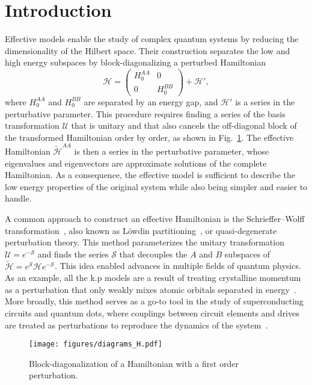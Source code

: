 \section{Introduction}

Effective models enable the study of complex quantum systems by reducing the dimensionality of the Hilbert space.
Their construction separates the low and high energy subspaces by block-diagonalizing a perturbed Hamiltonian
%
\begin{equation}
    \mathcal{H} = \begin{pmatrix}H_0^{AA} & 0 \\ 0 & H_0^{BB}\end{pmatrix} + \mathcal{H}',
\end{equation}
%
where $H_0^{AA}$ and $H_0^{BB}$ are separated by an energy gap, and $\mathcal{H}'$ is a series in the perturbative parameter.
This procedure requires finding a series of the basis transformation $\mathcal{U}$ that is unitary and that also cancels the off-diagonal block of the transformed Hamiltonian order by order, as shown in Fig.~\ref{fig:block_diagonalization}.
The effective Hamiltonian $\tilde{\mathcal{H}}^{AA}$ is then a series in the perturbative parameter, whose eigenvalues and eigenvectors are approximate solutions of the complete Hamiltonian.
As a consequence, the effective model is sufficient to describe the low energy properties of the original system while also being simpler and easier to handle.

A common approach to construct an effective Hamiltonian is the Schrieffer--Wolff transformation~\cite{Schrieffer_1966,Bravyi_2011}, also known as Löwdin partitioning~\cite{Lowdin_1962}, or quasi-degenerate perturbation theory.
This method parameterizes the unitary transformation $\mathcal{U} = e^{-\mathcal{S}}$ and finds the series $\mathcal{S}$ that decouples the $A$ and $B$ subspaces of $\tilde{\mathcal{H}} = e^{\mathcal{S}}\mathcal{H}e^{-\mathcal{S}}$.
This idea enabled advances in multiple fields of quantum physics.
As an example, all the k.p models are a result of treating crystalline momentum as a perturbation that only weakly mixes atomic orbitals separated in energy~\cite{Luttinger_1955}.
More broadly, this method serves as a go-to tool in the study of superconducting circuits and quantum dots, where couplings between circuit elements and drives are treated as perturbations to reproduce the dynamics of the system~\cite{Krantz_2019,Romhanyi_2015}.
%
\begin{figure}[h!]
    \centering
    \texttt{[image: figures/diagrams\_H.pdf]}
    \caption{
      Block-diagonalization of a Hamiltonian with a first order perturbation.
    }
    \label{fig:block_diagonalization}
\end{figure}

